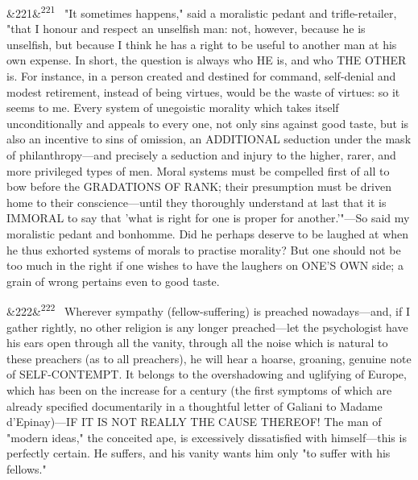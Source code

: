 \documentclass[12pt]{article}
\newcommand{\para}[1][]{\par\noindent\ifx&#1&\else\textsuperscript{\footnotesize #1}~\fi}
\begin{document}
\para[221] "It sometimes happens," said a moralistic pedant and trifle-retailer, "that I honour and respect an unselfish man: not, however, because he is unselfish, but because I think he has a right to be useful to another man at his own expense. In short, the question is always who HE is, and who THE OTHER is. For instance, in a person created and destined for command, self-denial and modest retirement, instead of being virtues, would be the waste of virtues: so it seems to me. Every system of unegoistic morality which takes itself unconditionally and appeals to every one, not only sins against good taste, but is also an incentive to sins of omission, an ADDITIONAL seduction under the mask of philanthropy---and precisely a seduction and injury to the higher, rarer, and more privileged types of men. Moral systems must be compelled first of all to bow before the GRADATIONS OF RANK; their presumption must be driven home to their conscience---until they thoroughly understand at last that it is IMMORAL to say that 'what is right for one is proper for another.'"---So said my moralistic pedant and bonhomme. Did he perhaps deserve to be laughed at when he thus exhorted systems of morals to practise morality? But one should not be too much in the right if one wishes to have the laughers on ONE'S OWN side; a grain of wrong pertains even to good taste.

\para[222] Wherever sympathy (fellow-suffering) is preached nowadays---and, if I gather rightly, no other religion is any longer preached---let the psychologist have his ears open through all the vanity, through all the noise which is natural to these preachers (as to all preachers), he will hear a hoarse, groaning, genuine note of SELF-CONTEMPT. It belongs to the overshadowing and uglifying of Europe, which has been on the increase for a century (the first symptoms of which are already specified documentarily in a thoughtful letter of Galiani to Madame d'Epinay)---IF IT IS NOT REALLY THE CAUSE THEREOF! The man of "modern ideas," the conceited ape, is excessively dissatisfied with himself---this is perfectly certain. He suffers, and his vanity wants him only "to suffer with his fellows."
\end{document}
